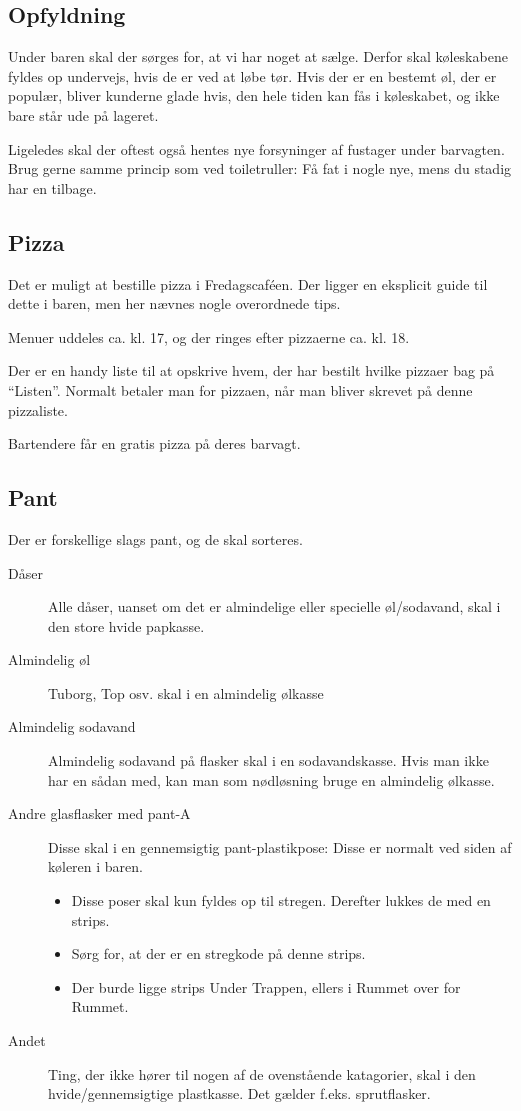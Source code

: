\subsection{Opfyldning}
\label{sec:intra:opfyldning}

Under baren skal der sørges for, at vi har noget at sælge. Derfor skal
køleskabene fyldes op undervejs, hvis de er ved at løbe tør. Hvis der
er en bestemt øl, der er populær, bliver kunderne glade hvis, den hele
tiden kan fås i køleskabet, og ikke bare står ude på lageret.

Ligeledes skal der oftest også hentes nye forsyninger af fustager
under barvagten. Brug gerne samme princip som ved toiletruller: Få fat
i nogle nye, mens du stadig har en tilbage.

\subsection{Pizza}
\label{sec:intra:pizza}

Det er muligt at bestille pizza i Fredagscaféen. Der ligger en
eksplicit guide til dette i baren, men her nævnes nogle overordnede tips.

Menuer uddeles ca. kl. 17, og der ringes efter pizzaerne ca. kl. 18.

Der er en handy liste til at opskrive hvem, der har bestilt hvilke
pizzaer bag på ``Listen''. Normalt betaler man for pizzaen, når man
bliver skrevet på denne pizzaliste.

Bartendere får en gratis pizza på deres barvagt.

\subsection{Pant}
\label{sec:intra:pant}

Der er forskellige slags pant, og de skal sorteres.
\begin{description}
\item[Dåser] Alle dåser, uanset om det er almindelige eller specielle
  øl/sodavand, skal i den store hvide papkasse.
\item[Almindelig øl] Tuborg, Top osv. skal i en almindelig ølkasse
\item[Almindelig sodavand] Almindelig sodavand på flasker skal i en
  sodavandskasse. Hvis man ikke har en sådan med, kan man som
  nødløsning bruge en almindelig ølkasse.
\item[Andre glasflasker med pant-A] Disse skal i en gennemsigtig
  pant-plastikpose: Disse er normalt ved siden af køleren i baren.
  \begin{itemize}
  \item Disse poser skal kun fyldes op til stregen. Derefter lukkes de
    med en strips.
  \item  Sørg for, at der er en stregkode på denne
    strips.
  \item Der burde ligge strips Under Trappen, ellers i Rummet over
    for Rummet.
  \end{itemize}
\item[Andet] Ting, der ikke hører til nogen af de ovenstående
  katagorier, skal i den hvide/gennemsigtige plastkasse. Det gælder
  f.eks. sprutflasker.
\end{description}

